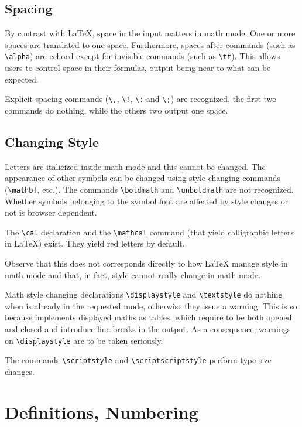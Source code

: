 \subsection{Spacing}\label{spacemathref}
By contrast with \LaTeX{}, space in the input matters in math mode.
One or more spaces are translated to one space.
Furthermore,
spaces after commands (such as \verb+\alpha+) are echoed
except for invisible commands (such as \verb+\tt+).
This allows users to control space in their formulas, output being
near to what can be expected.


Explicit spacing commands (\verb+\,+, \verb+\!+, \verb+\:+ and
\verb+\;+) are recognized, the first two commands do nothing, while
the others two output one space.

\subsection{Changing Style}

Letters are italicized inside math mode and this cannot be
changed. The appearance of
other symbols can be changed using
\LaTeXe{} style changing commands (\verb+\mathbf+, etc.).
The commands \verb+\boldmath+ and \verb+\unboldmath+ are not
recognized. Whether symbols belonging to the symbol font are affected
by style changes or not is browser dependent.

The \verb+\cal+ declaration and the \verb+\mathcal+ command (that
yield calligraphic letters in \LaTeX) exist. They yield red letters by
default.

Observe that this does not corresponds directly to how \LaTeX{} manage style
in math mode and that, in fact, style cannot really change in math mode.

Math style changing declarations \verb+\displaystyle+ and
\verb+\textstyle+ do nothing when \hevea{} is already in the requested
mode,
otherwise they issue a warning.
This is so because \hevea{} implements displayed maths as tables,
which require to be both opened and closed and introduce line breaks
in the output.
As a consequence, warnings on \verb+\displaystyle+ are to be taken seriously.


The commands \verb+\scriptstyle+ and \verb+\scriptscriptstyle+
perform type size changes.

\section{Definitions, Numbering}

